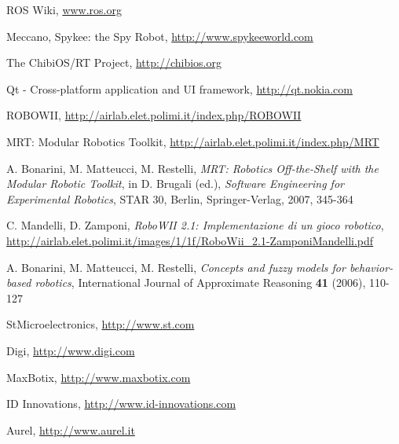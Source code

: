 \begin{thebibliography}{9}

  ROS Wiki, \url{www.ros.org}

  Meccano, Spykee: the Spy Robot, \url{http://www.spykeeworld.com}

  The ChibiOS/RT Project, \url{http://chibios.org}

	Qt - Cross-platform application and UI framework, \url{http://qt.nokia.com}

  ROBOWII, \url{http://airlab.elet.polimi.it/index.php/ROBOWII}

  MRT: Modular Robotics Toolkit, \url{http://airlab.elet.polimi.it/index.php/MRT}

  A. Bonarini, M. Matteucci, M. Restelli, \emph{MRT: Robotics Off-the-Shelf with the Modular Robotic Toolkit},
  in D. Brugali (ed.), \emph{Software Engineering for Experimental Robotics}, STAR 30, Berlin, Springer-Verlag, 2007, 345-364

  C. Mandelli, D. Zamponi, \emph{RoboWII 2.1: Implementazione di un gioco robotico}, \url{http://airlab.elet.polimi.it/images/1/1f/RoboWii_2.1-ZamponiMandelli.pdf}

  A. Bonarini, M. Matteucci, M. Restelli, \emph{Concepts and fuzzy models for behavior-based robotics}, International Journal of Approximate Reasoning \textbf{41} (2006), 110-127

  StMicroelectronics, \url{http://www.st.com}

  Digi, \url{http://www.digi.com}
  
  MaxBotix, \url{http://www.maxbotix.com}
  
  ID Innovations, \url{http://www.id-innovations.com}
  
  Aurel, \url{http://www.aurel.it}
    

\end{thebibliography}